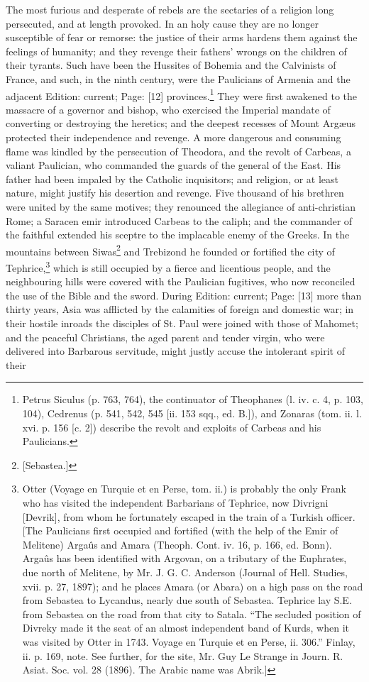 The most furious and desperate of rebels are the sectaries of a religion long persecuted, and at length provoked. In an holy cause they are no longer susceptible of fear or remorse: the justice of their arms hardens them against the feelings of humanity; and they revenge their fathers\texthebrew{}’ wrongs on the children of their tyrants. Such have been the Hussites of Bohemia and the Calvinists of France, and such, in the ninth century, were the Paulicians of Armenia and the adjacent Edition: current; Page: [12] provinces.\footnote{Petrus Siculus (p. 763, 764), the continuator of Theophanes (l. iv. c. 4, p. 103, 104), Cedrenus (p. 541, 542, 545 [ii. 153 sqq., ed. B.]), and Zonaras (tom. ii. l. xvi. p. 156 [c. 2]) describe the revolt and exploits of Carbeas and his Paulicians.} They were first awakened to the massacre of a governor and bishop, who exercised the Imperial mandate of converting or destroying the heretics; and the deepest recesses of Mount Argæus protected their independence and revenge. A more dangerous and consuming flame was kindled by the persecution of Theodora, and the revolt of Carbeas, a valiant Paulician, who commanded the guards of the general of the East. His father had been impaled by the Catholic inquisitors; and religion, or at least nature, might justify his desertion and revenge. Five thousand of his brethren were united by the same motives; they renounced the allegiance of anti-christian Rome; a Saracen emir introduced Carbeas to the caliph; and the commander of the faithful extended his sceptre to the implacable enemy of the Greeks. In the mountains between Siwas\footnote{[Sebastea.]} and Trebizond he founded or fortified the city of Tephrice,\footnote{Otter (Voyage en Turquie et en Perse, tom. ii.) is probably the only Frank who has visited the independent Barbarians of Tephrice, now Divrigni [Devrik], from whom he fortunately escaped in the train of a Turkish officer. [The Paulicians first occupied and fortified (with the help of the Emir of Melitene) Argaûs and Amara (Theoph. Cont. iv. 16, p. 166, ed. Bonn). Argaûs has been identified with Argovan, on a tributary of the Euphrates, due north of Melitene, by Mr. J. G. C. Anderson (Journal of Hell. Studies, xvii. p. 27, 1897); and he places Amara (or Abara) on a high pass on the road from Sebastea to Lycandus, nearly due south of Sebastea. Tephrice lay S.E. from Sebastea on the road from that city to Satala. \texthebrew{“}The secluded position of Divreky made it the seat of an almost independent band of Kurds, when it was visited by Otter in 1743. Voyage en Turquie et en Perse, ii. 306.\texthebrew{}” Finlay, ii. p. 169, note. See further, for the site, Mr. Guy Le Strange in Journ. R. Asiat. Soc. vol. 28 (1896). The Arabic name was Abrik.]} which is still occupied by a fierce and licentious people, and the neighbouring hills were covered with the Paulician fugitives, who now reconciled the use of the Bible and the sword. During Edition: current; Page: [13] more than thirty years, Asia was afflicted by the calamities of foreign and domestic war; in their hostile inroads the disciples of St. Paul were joined with those of Mahomet; and the peaceful Christians, the aged parent and tender virgin, who were delivered into Barbarous servitude, might justly accuse the intolerant spirit of their 